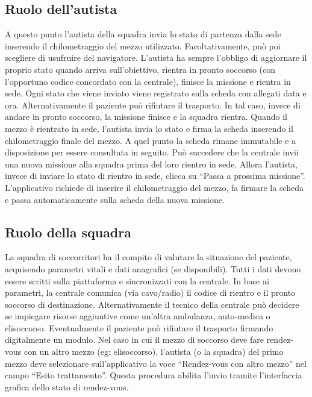 \documentclass{article}
\begin{document}
    \subsection{Ruolo dell’autista}
    A questo punto l’autista della squadra invia lo stato di partenza dalla sede inserendo il chilometraggio del mezzo utilizzato. Facoltativamente, può poi scegliere di usufruire del navigatore.
    L’autista ha sempre l’obbligo di aggiornare il proprio stato quando arriva sull’obiettivo, rientra in pronto soccorso (con l’opportuno codice concordato con la centrale), finisce la missione e rientra in sede. Ogni stato che viene inviato viene registrato sulla scheda con allegati data e ora.
    Alternativamente il paziente può rifiutare il trasporto. In tal caso, invece di andare in pronto soccorso, la missione finisce e la squadra rientra.
    Quando il mezzo è rientrato in sede, l’autista invia lo stato e firma la scheda inserendo il chilometraggio finale del mezzo. A quel punto la scheda rimane immutabile e a disposizione per essere consultata in seguito.
    Può succedere che la centrale invii una nuova missione alla squadra prima del loro rientro in sede.
    Allora l’autista, invece di inviare lo stato di rientro in sede, clicca su “Passa a prossima missione”. L’applicativo richiede di inserire il chilometraggio del mezzo, fa firmare la scheda e passa automaticamente sulla scheda della nuova missione.

    \subsection{Ruolo della squadra}
    La squadra di soccorritori ha il compito di valutare la situazione del paziente, acquisendo parametri vitali e dati anagrafici (se disponibili). Tutti i dati devono essere scritti sulla piattaforma e sincronizzati con la centrale. In base ai parametri, la centrale comunica (via cavo/radio) il codice di rientro e il pronto soccorso di destinazione. Alternativamente il tecnico della centrale può decidere se impiegare risorse aggiuntive come un’altra ambulanza, auto-medica o elisoccorso.
    Eventualmente il paziente può rifiutare il trasporto firmando digitalmente un modulo.
    Nel caso in cui il mezzo di soccorso deve fare rendez-vous con un altro mezzo (eg: elisoccorso), l’autista (o la squadra) del primo mezzo deve selezionare sull’applicativo la voce “Rendez-vous con altro mezzo” nel campo “Esito trattamento”. Questa procedura abilita l’invio tramite l’interfaccia grafica dello stato di rendez-vous.
\end{document}
